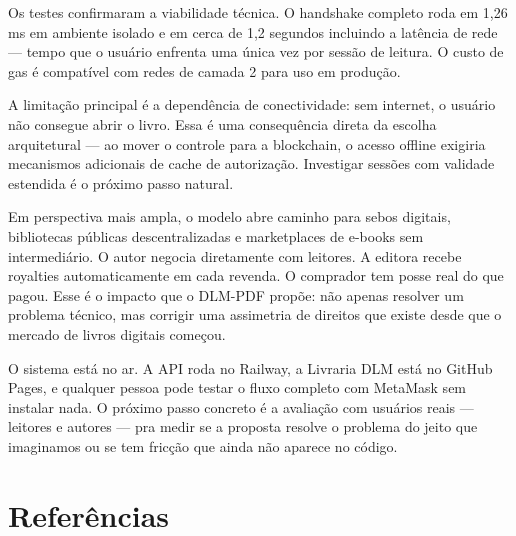 \documentclass[12pt]{article}
\begin{document}
Os testes confirmaram a viabilidade técnica. O handshake completo roda em 1,26 ms em ambiente isolado e em cerca de 1,2 segundos incluindo a latência de rede — tempo que o usuário enfrenta uma única vez por sessão de leitura. O custo de gas é compatível com redes de camada 2 para uso em produção.

A limitação principal é a dependência de conectividade: sem internet, o usuário não consegue abrir o livro. Essa é uma consequência direta da escolha arquitetural — ao mover o controle para a blockchain, o acesso offline exigiria mecanismos adicionais de cache de autorização. Investigar sessões com validade estendida é o próximo passo natural.

Em perspectiva mais ampla, o modelo abre caminho para sebos digitais, bibliotecas públicas descentralizadas e marketplaces de e-books sem intermediário. O autor negocia diretamente com leitores. A editora recebe royalties automaticamente em cada revenda. O comprador tem posse real do que pagou. Esse é o impacto que o DLM-PDF propõe: não apenas resolver um problema técnico, mas corrigir uma assimetria de direitos que existe desde que o mercado de livros digitais começou.

O sistema está no ar. A API roda no Railway, a Livraria DLM está no GitHub Pages, e qualquer pessoa pode testar o fluxo completo com MetaMask sem instalar nada. O próximo passo concreto é a avaliação com usuários reais — leitores e autores — pra medir se a proposta resolve o problema do jeito que imaginamos ou se tem fricção que ainda não aparece no código.

\section*{Referências}
\end{document}
